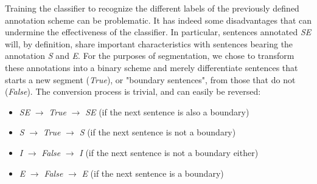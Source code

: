 Training the classifier to recognize the different labels of the previously defined annotation scheme can be problematic. It has indeed some disadvantages that can undermine the effectiveness of the classifier. In particular, sentences annotated \textit{SE} will, by definition, share important characteristics with sentences bearing the annotation \textit{S} and \textit{E}. For the purposes of segmentation, we chose to transform these annotations into a binary scheme and merely differentiate sentences that starts a new segment (\textit{True}), or "boundary sentences", from those that do not (\textit{False}). The conversion process is trivial, and can easily be reversed:

\begin{itemize}
    \item \textit{SE} $\longrightarrow$ \textit{True} $\longrightarrow$ \textit{SE} (if the next sentence is also a boundary)
    \item \textit{S} $\longrightarrow$ \textit{True} $\longrightarrow$ \textit{S} (if the next sentence is not a boundary)
    \item \textit{I} $\longrightarrow$ \textit{False} $\longrightarrow$ \textit{I} (if the next sentence is not a boundary either)
    \item \textit{E} $\longrightarrow$ \textit{False} $\longrightarrow$ \textit{E} (if the next sentence is a boundary)
\end{itemize}
